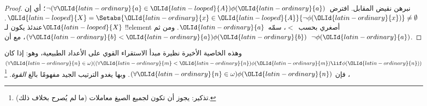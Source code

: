 \documentclass[../../../include/open-logic-section]{subfiles}
\begin{document}
\begin{proof}
نبرهن نقيض المقابل. افترض~$\lnot(\forall \OLId{latin-ordinary}{a} \in \OLId{latin-looped}{A})\phi(\OLId{latin-ordinary}{a})$؛ أي إن
$\OLId{latin-looped}{X} = \Setabs{\OLId{latin-ordinary}{x} \in \OLId{latin-looped}{A}}{\lnot\phi(\OLId{latin-ordinary}{x})} \neq \emptyset$. عندئذ يكون
لـ$\OLId{latin-looped}{X}$ !!{element} أصغري بحسب~$<$، سمّه~$\OLId{latin-ordinary}{a}$. ومن ثم
$(\forall \OLId{latin-ordinary}{b} < \OLId{latin-ordinary}{a})\phi(\OLId{latin-ordinary}{b})$، مع أن~$\lnot \phi(\OLId{latin-ordinary}{a})$.
\end{proof}\noindent
وهذه الخاصية الأخيرة نظيرة مبدأ الاستقراء القوي على الأعداد الطبيعية،
وهو: إذا كان
$(\forall \OLId{latin-ordinary}{n} \in \omega)((\forall \OLId{latin-ordinary}{m} < \OLId{latin-ordinary}{n})\phi(\OLId{latin-ordinary}{m}) \lif \phi(\OLId{latin-ordinary}{n}))$، فإن
$(\forall \OLId{latin-ordinary}{n} \in \omega)\phi(\OLId{latin-ordinary}{n})$. وبها يغدو الترتيب الجيد مفهومًا بالغ
\emph{القوة}.
\footnote{تذكير: يجوز أن تكون لجميع الصيغ معاملات (ما لم يُصرح بخلاف ذلك).}
\end{document}
